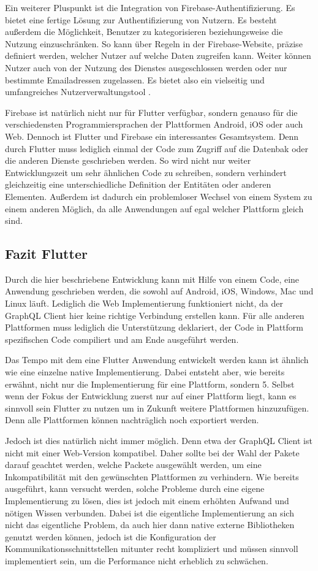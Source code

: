 Ein weiterer Pluspunkt ist die Integration von Firebase-Authentifizierung. Es bietet eine fertige Lösung zur Authentifizierung von Nutzern. Es besteht außerdem die Möglichkeit, Benutzer zu kategorisieren beziehungsweise die Nutzung einzuschränken. So kann über Regeln in der Firebase-Website, präzise definiert werden, welcher Nutzer auf welche Daten zugreifen kann. Weiter können Nutzer auch von der Nutzung des Dienstes ausgeschlossen werden oder nur bestimmte Emailadressen zugelassen. Es bietet also ein vielseitig und umfangreiches Nutzerverwaltungstool \cite{Flutter_Apprentice}.

Firebase ist natürlich nicht nur für Flutter verfügbar, sondern genauso für die verschiedensten Programmiersprachen der Plattformen Android, iOS oder auch Web. Dennoch ist Flutter und Firebase ein interessantes Gesamtsystem. Denn durch Flutter muss lediglich einmal der Code zum Zugriff auf die Datenbak oder die anderen Dienste geschrieben werden. So wird nicht nur weiter Entwicklungszeit um sehr ähnlichen Code zu schreiben, sondern verhindert gleichzeitig eine unterschiedliche Definition der Entitäten oder anderen Elementen. Außerdem ist dadurch ein problemloser Wechsel von einem System zu einem anderen Möglich, da alle Anwendungen auf egal welcher Plattform gleich sind.

\subsection{Fazit Flutter}
Durch die hier beschriebene Entwicklung kann mit Hilfe von einem Code, eine Anwendung geschrieben werden, die sowohl auf Android, iOS, Windows, Mac und Linux läuft. Lediglich die Web Implementierung funktioniert nicht, da der GraphQL Client hier keine richtige Verbindung erstellen kann. Für alle anderen Plattformen muss lediglich die Unterstützung deklariert, der Code in Plattform spezifischen Code compiliert und am Ende ausgeführt werden.

Das Tempo mit dem eine Flutter Anwendung entwickelt werden kann ist ähnlich wie eine einzelne native Implementierung. Dabei entsteht aber, wie bereits erwähnt, nicht nur die Implementierung für eine Plattform, sondern 5. Selbst wenn der Fokus der Entwicklung zuerst nur auf einer Plattform liegt, kann es sinnvoll sein Flutter zu nutzen um in Zukunft weitere Plattformen hinzuzufügen. Denn alle Plattformen können nachträglich noch exportiert werden.

Jedoch ist dies natürlich nicht immer möglich. Denn etwa der GraphQL Client ist nicht mit einer Web-Version kompatibel. Daher sollte bei der Wahl der Pakete darauf geachtet werden, welche Packete ausgewählt werden, um eine Inkompatibilität mit den gewünschten Plattformen zu verhindern. Wie bereits ausgeführt, kann versucht werden, solche Probleme durch eine eigene Implementierung zu lösen, dies ist jedoch mit einem erhöhten Aufwand und nötigen Wissen verbunden. Dabei ist die eigentliche Implementierung an sich nicht das eigentliche Problem, da auch hier dann native externe Bibliotheken genutzt werden können, jedoch ist die Konfiguration der Kommunikationsschnittstellen mitunter recht kompliziert und müssen sinnvoll implementiert sein, um die Performance nicht erheblich zu schwächen.

